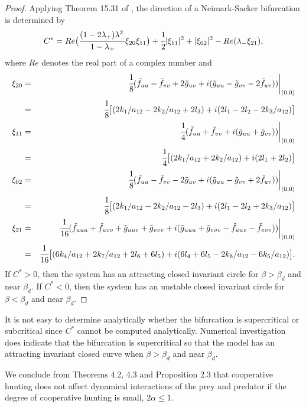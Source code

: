 \documentclass[11pt]{article}
\begin{document}
\begin{proof}
Applying Theorem 15.31 of \cite{hale}, the direction of a
Neimark-Sacker bifurcation is determined by
 \begin{equation}\label{Cst}
 C^*=Re\big(\cfrac{(1-2\lambda_+)\lambda_-^2}{1-\lambda_+}\xi_{20}\xi_{11}\big)+\cfrac{1}{2}|\xi_{11}|^2+|\xi_{02}|^2-Re(\lambda_-\xi_{21}),
 \end{equation}
 where $Re$ denotes the real part of a complex number and
\begin{eqnarray}\xi_{20}&=&\cfrac{1}{8}({\tilde f}_{uu}-{\tilde
f}_{vv}+2{\tilde
g}_{uv}+i({\tilde g}_{uu}-{\tilde g}_{vv}-2{\tilde f}_{uv}))\bigg|_{(0,0)}\nonumber\\
&=& \cfrac{1}{8}\big[(2k_1/a_{12}-2k_2/a_{12}+2l_3)+i(2l_1-2l_2-2k_3/a_{12})\big]\nonumber\\
 \xi_{11}&=&\cfrac{1}{4}({\tilde f}_{uu}+{\tilde f}_{vv}+i({\tilde
 g}_{uu}+{\tilde
 g}_{vv}))\bigg|_{(0,0)}\nonumber\\
 &=&
 \cfrac{1}{4}\big[(2k_1/a_{12}+2k_2/a_{12})+i(2l_1+2l_2)\big]\\
 \xi_{02}&=&\cfrac{1}{8}({\tilde f}_{uu}-{\tilde f}_{vv}-2{\tilde g}_{uv}+i({\tilde g}_{uu}-{\tilde
 g}_{vv}+2{\tilde
 f}_{uv}))\bigg|_{(0,0)}\nonumber\\
 &=&
 \cfrac{1}{8}\big[(2k_1/a_{12}-2k_2/a_{12}-2l_3)+i(2l_1-2l_2+2k_3/a_{12})\big]\nonumber\\
 \xi_{21}&=&\cfrac{1}{16}({\tilde f}_{uuu}+{\tilde f}_{uvv}+{\tilde g}_{uuv}+{\tilde g}_{vvv}+i({\tilde g}_{uuu}+{\tilde g}_{vvv}-{\tilde
 f}_{uuv}-{\tilde
 f}_{vvv}))\bigg|_{(0,0)}\nonumber\\
 &=&
 \cfrac{1}{16}\big[(6k_4/a_{12}+2k_7/a_{12}+2l_6+6l_5)+i(6l_4+6l_5-2k_6/a_{12}-6k_5/a_{12})\big]\nonumber.
 \end{eqnarray}
 If $C^*>0$, then the system has an attracting closed invariant circle for $\beta>\beta_d$ and near $\beta_d$. If $C^*<0$,
 then the system has an unstable closed invariant circle for $
 \beta<\beta_d$ and near $\beta_d$. \end{proof}

\medskip
It is not easy to determine analytically whether the bifurcation
is supercritical or subcritical since $C^*$ cannot be computed
analytically. Numerical investigation does indicate that the
bifurcation is supercritical so that the model has an attracting
invariant closed curve when $\beta>\beta_d$ and near $\beta_d$.



We conclude from Theorems 4.2, 4.3 and Proposition 2.3 that
cooperative hunting does not affect dynamical interactions of the
prey and predator if the degree of cooperative hunting is small,
$2\alpha\leq 1$.
\end{document}
